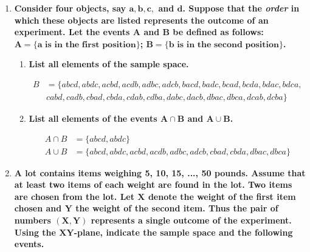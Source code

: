 \documentclass[10pt, oneside]{article}
\begin{document}
\begin{enumerate}[label=1.\arabic*]
\begin{enumerate}
	\end{enumerate}

\item  \begin{tcolorbox}[
  colback=Cerulean!5!white,
  colframe=Cerulean!75!black]
\textbf{Consider four objects, say $\bm{a, b, c,}$ and $\bm{d}$. Suppose that the \textit{order} in which these objects are listed represents the outcome of an experiment. Let the events $\bm{A}$ and $\bm{B}$ be defined as follows: $\bm{A = \{ a \text{ is in the first position}\}}$; $\bm{B = \{b \text{ is in the second position}\}}$.}
\end{tcolorbox}

	\begin{enumerate}
	\item  \begin{tcolorbox}[
	  colback=Cerulean!5!white,
	  colframe=Cerulean!75!black]
	\textbf{List all elements of the sample space.}
	\end{tcolorbox}
	
	\begin{framed}
	\begin{align*}
	B &= \{ abcd, abdc, acbd, acdb, adbc, adcb, bacd, badc, bcad, bcda, bdac, bdca, \\
	&cabd, cadb, cbad, cbda, cdab, cdba, dabc, dacb, dbac, dbca, dcab, dcba \} 
	\end{align*}
	\end{framed}
	
	\item  \begin{tcolorbox}[
	  colback=Cerulean!5!white,
	  colframe=Cerulean!75!black]
	\textbf{List all elements of the events $\bm{A \cap B}$ and $\bm{A \cup B}$.}
	\end{tcolorbox}
	
	\begin{framed}
	\begin{align*}
	A \cap B &= \{ abcd, abdc \} \\
	A \cup B &= \{ abcd, abdc, acbd, acdb, adbc, adcb, cbad, cbda, dbac, dbca \}
	\end{align*}
	\end{framed}
	
	\end{enumerate}

\item  \begin{tcolorbox}[
  colback=Cerulean!5!white,
  colframe=Cerulean!75!black]
\textbf{A lot contains items weighing 5, 10, 15, ..., 50 pounds. Assume that at least two items of each weight are found in the lot. Two items are chosen from the lot. Let $\bm{X}$ denote the weight of the first item chosen and $\bm{Y}$ the weight of the second item. Thus the pair of numbers $\bm{(X,Y)}$ represents a single outcome of the experiment. Using the $\bm{XY}$-plane, indicate the sample space and the following events.}
\end{tcolorbox}


\end{enumerate}
\end{document}
